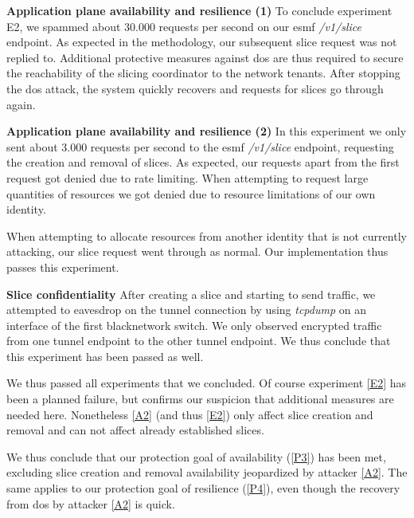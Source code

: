 \begin{description}[style=multiline, labelwidth=0.7cm]

    \item[\ref{E2}] \textbf{Application plane availability and resilience (1)} To conclude experiment E2, we spammed about 30.000 requests per second on our \acrshort{esmf} \textit{/v1/slice} endpoint. As expected in the methodology, our subsequent slice request was not replied to. Additional protective measures against \acrshort{dos} are thus required to secure the reachability of the slicing coordinator to the network tenants. After stopping the \acrshort{dos} attack, the system quickly recovers and requests for slices go through again.

    \item[\ref{E3}] \textbf{Application plane availability and resilience (2)} In this experiment we only sent about 3.000 requests per second to the \acrshort{esmf} \textit{/v1/slice} endpoint, requesting the creation and removal of slices. As expected, our requests apart from the first request got denied due to rate limiting. When attempting to request large quantities of resources we got denied due to resource limitations of our own identity.

    When attempting to allocate resources from another identity that is not currently attacking, our slice request went through as normal. Our implementation thus passes this experiment.

    \item[\ref{E4}] \textbf{Slice confidentiality} After creating a slice and starting to send traffic, we attempted to eavesdrop on the tunnel connection by using \textit{tcpdump} on an interface of the first \gls{blacknetwork} switch. We only observed encrypted traffic from one tunnel endpoint to the other tunnel endpoint. We thus conclude that this experiment has been passed as well.
\end{description}

We thus passed all experiments that we concluded. Of course experiment \ref{E2} has been a planned failure, but confirms our suspicion that additional measures are needed here. Nonetheless \ref{A2} (and thus \ref{E2}) only affect slice creation and removal and can not affect already established slices.

We thus conclude that our protection goal of availability (\ref{P3}) has been met, excluding slice creation and removal availability jeopardized by attacker \ref{A2}. The same applies to our protection goal of resilience (\ref{P4}), even though the recovery from \acrshort{dos} by attacker \ref{A2} is quick.

